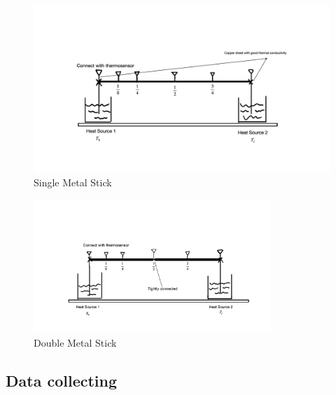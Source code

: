 \documentclass[a4paper,12pt]{article}
\begin{document}
\begin{figure}[H] %
\centering %
\includegraphics[width=1\textwidth]{插图带文字.001.png} %
\caption{Single Metal Stick} %
\end{figure}





\begin{figure}[H] %
\centering %
\includegraphics[width=0.8\textwidth]{插图带文字.002.png} %
\caption{Double Metal Stick} %
\end{figure}












\subsection{Data collecting}
\end{document}
